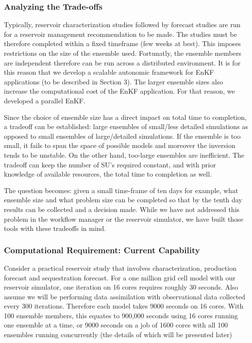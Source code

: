 \documentclass{rspublic}
\begin{document}
\subsubsection{Analyzing the Trade-offs}  

Typically, reservoir characterization studies followed by forecast
studies are run for a reservoir management recommendation to be
made. The studies must be therefore completed within a fixed timeframe
(few weeks at best). This imposes restrictions on the size of the
ensemble used. Fortunatly, the ensemble members are independent
therefore can be run across a distributed environment. It is for this
reason that we develop a scalable autonomic framework for EnKF
applications (to be described in Section 3). The larger ensemble sizes
also increase the computational cost of the EnKF application. For that
reason, we developed a parallel EnKF.

Since the choice of ensemble size has a direct impact on total time to
completion, a tradeoff can be established: large ensembles of
small/less detailed simulations as opposed to small ensembles of
large/detailed simulations. If the ensemble is too small, it fails to
span the space of possible models and moreover the inversion tends to
be unstable. On the other hand, too-large ensembles are
inefficient. The tradeoff can keep the number of SU's required
constant, and with prior knowledge of available resources, the total
time to completion as well. 



The question becomes: given a small
time-frame of ten days for example, what ensemble size and what
problem size can be completed so that by the tenth day results can be
collected and a decision made. While we have not addressed this
problem in the workflow manager or the reservoir simulator, we have
built those tools with these tradeoffs in mind.

\subsubsection{Computational Requirement: Current Capability}

Consider a practical reservoir study that involves characterization,
production forecast and sequestration forecast. For a one million grid
cell model with our reservoir simulator, one iteration on 16 cores
requires roughly 30 seconds. Also assume we will be performing data
assimilation with observational data collected every 300 iterations.
Therefore each model takes 9000 seconds on 16 cores. With 100 ensemble
members, this equates to 900,000 seconds using 16 cores running one
ensemble at a time, or 9000 seconds on a job of 1600 cores with all 100
ensembles running concurrently (the details of which will be presented
later)
\end{document}
